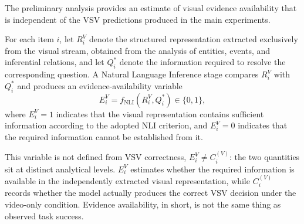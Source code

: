 The preliminary analysis provides an estimate of visual evidence availability that is independent of the VSV predictions produced in the main experiments.

For each item \(i\), let \(R_i^{V}\) denote the structured representation extracted exclusively from the visual stream, obtained from the analysis of entities, events, and inferential relations, and let \(Q_i^{*}\) denote the information required to resolve the corresponding question. A Natural Language Inference stage compares \(R_i^{V}\) with \(Q_i^{*}\) and produces an evidence-availability variable
\begin{equation}
E_i^{V}
=
f_{\mathrm{NLI}}
\left(
    R_i^{V},
    Q_i^{*}
    \right)
    \in
    \{0,1\},
\end{equation}
where \(E_i^{V}=1\) indicates that the visual representation contains sufficient information according to the adopted NLI criterion, and \(E_i^{V}=0\) indicates that the required information cannot be established from it.

This variable is not defined from VSV correctness, \(E_i^{V} \neq C_i^{(V)}\): the two quantities sit at distinct analytical levels. \(E_i^{V}\) estimates whether the required information is available in the independently extracted visual representation, while \(C_i^{(V)}\) records whether the model actually produces the correct VSV decision under the video-only condition. Evidence availability, in short, is not the same thing as observed task success.


